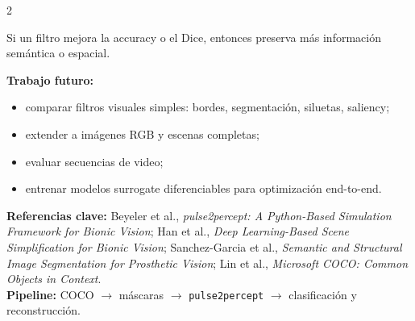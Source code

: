 \documentclass[final]{article}
\begin{document}
\begin{minipage}[t]{\textwidth}
\begin{multicols}{2}
{Si un filtro mejora la accuracy o el Dice, entonces preserva más información semántica o espacial.

\textbf{Trabajo futuro:}
\begin{itemize}
    \item comparar filtros visuales simples: bordes, segmentación, siluetas, saliency;
    \item extender a imágenes RGB y escenas completas;
    \item evaluar secuencias de video;
    \item entrenar modelos surrogate diferenciables para optimización end-to-end.
\end{itemize}
}

\end{multicols}

\begin{tcolorbox}[
    enhanced,
    colback=softgray,
    colframe=mainblue,
    boxrule=0.75pt,
    arc=1.5mm,
    left=3mm,
    right=3mm,
    top=1.2mm,
    bottom=1.2mm
]
{\fontsize{9.2}{10.8}\selectfont
\textbf{Referencias clave:}
Beyeler et al., \emph{pulse2percept: A Python-Based Simulation Framework for Bionic Vision};
Han et al., \emph{Deep Learning-Based Scene Simplification for Bionic Vision};
Sanchez-Garcia et al., \emph{Semantic and Structural Image Segmentation for Prosthetic Vision};
Lin et al., \emph{Microsoft COCO: Common Objects in Context}.
\hfill
\\
\textbf{Pipeline:} COCO $\rightarrow$ máscaras $\rightarrow$ \texttt{pulse2percept} $\rightarrow$ clasificación y reconstrucción.
}
\end{tcolorbox}

\end{minipage}
\end{document}
